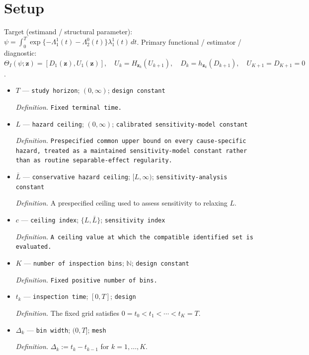 \documentclass{article}
\begin{document}
\section{Setup}

Target (estimand / structural parameter): \(\psi=\int_0^T\exp\{-\Lambda_1^1(t)-\Lambda_2^0(t)\}\lambda_1^1(t)\,dt\).
Primary functional / estimator / diagnostic: \(\Theta_I(\psi;\mathbf z)=[D_1(\mathbf z),U_1(\mathbf z)],\quad U_k=H_{\mathbf z_k}(U_{k+1}),\quad D_k=h_{\mathbf z_k}(D_{k+1}),\quad U_{K+1}=D_{K+1}=0\).
\begin{itemize}
  \item \(T\) --- \texttt{study horizon}; \((0,\infty)\); \texttt{design constant}
  \par\smallskip\noindent\emph{Definition.} \texttt{Fixed terminal time.}
  \item \(L\) --- \texttt{hazard ceiling}; \((0,\infty)\); \texttt{calibrated sensitivity-\allowbreak{}model constant}
  \par\smallskip\noindent\emph{Definition.} \texttt{Prespecified common upper bound on every cause-\allowbreak{}specific hazard,\allowbreak{} treated as a maintained sensitivity-\allowbreak{}model constant rather than as routine separable-\allowbreak{}effect regularity.}
  \item \(\bar L\) --- \texttt{conservative hazard ceiling}; \([L,\infty)\); \texttt{sensitivity-\allowbreak{}analysis constant}
  \par\smallskip\noindent\emph{Definition.} A prespecified ceiling used to assess sensitivity to relaxing \(L\).
  \item \(c\) --- \texttt{ceiling index}; \(\{L,\bar L\}\); \texttt{sensitivity index}
  \par\smallskip\noindent\emph{Definition.} \texttt{A ceiling value at which the compatible identified set is evaluated.}
  \item \(K\) --- \texttt{number of inspection bins}; \(\mathbb N\); \texttt{design constant}
  \par\smallskip\noindent\emph{Definition.} \texttt{Fixed positive number of bins.}
  \item \(t_k\) --- \texttt{inspection time}; \([0,T]\); \texttt{design}
  \par\smallskip\noindent\emph{Definition.} The fixed grid satisfies \(0=t_0<t_1<\cdots<t_K=T\).
  \item \(\Delta_k\) --- \texttt{bin width}; \((0,T]\); \texttt{mesh}
  \par\smallskip\noindent\emph{Definition.} \(\Delta_k:=t_k-t_{k-1}\) for \(k=1,\ldots,K\).

\end{itemize}
\end{document}
